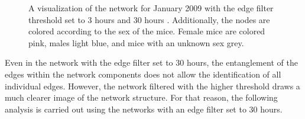 \begin{figure}[htpb]%
	\centering 
	\qquad 
			
	\caption[Network visualizations with different edge filter values]{A visualization of the network for January 2009 with the edge filter threshold set to 3 hours  and 30 hours . Additionally, the nodes are colored according to the sex of the mice. Female mice are colored pink, males light blue, and mice with an unknown sex grey.}  
\end{figure}


Even in the network with the edge filter set to 30 hours, the entanglement of the edges within the network components does not allow the identification of all individual edges. However, the network filtered with the higher threshold draws a much clearer image of the network structure. For that reason, the following analysis is carried out using the networks with an edge filter set to 30 hours.


